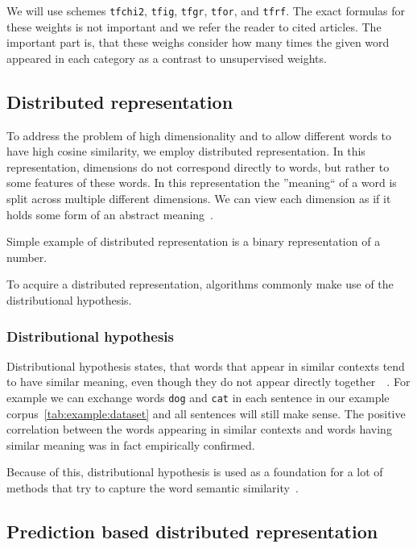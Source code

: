     We will use schemes \texttt{tfchi2}, \texttt{tfig}, \texttt{tfgr}, \texttt{tfor}, and \texttt{tfrf}.
    The exact formulas for these weights is not important and we refer the reader to cited articles.
    The important part is, that these weighs consider how many times the given word appeared in each category as a contrast to unsupervised weights. 
    
    
    \subsection{Distributed representation}
    
    To address the problem of high dimensionality and to allow different words to have high cosine similarity, we employ distributed representation.
    In this representation, dimensions do not correspond directly to words, but rather to some features of these words.
    In this representation the ''meaning`` of a word is split across multiple different dimensions.
    We can view each dimension as if it holds some form of an abstract meaning~\cite{le2014distributed}. 
    
    Simple example of distributed representation is a binary representation of a number.
    
    To acquire a distributed representation, algorithms commonly make use of the distributional hypothesis.

    \subsubsection{Distributional hypothesis}
    
    Distributional hypothesis states, that words that appear in similar contexts tend to have similar meaning,
    even though they do not appear directly together~\cite{harris1954distributional}~\cite{Rubenstein:1965:CCS:365628.365657}. %
    For example we can exchange words \texttt{dog} and \texttt{cat} in each sentence in our example corpus~\ref{tab:example:dataset}
    and all sentences will still make sense. 
    The positive correlation between the words appearing in similar contexts and words having similar meaning was in fact empirically confirmed.
    
    Because of this, distributional hypothesis is used as a foundation for a lot of methods that try to capture the word semantic similarity~\cite{rubenstein1965contextual}. 

    \subsection{Prediction based distributed representation}
    
